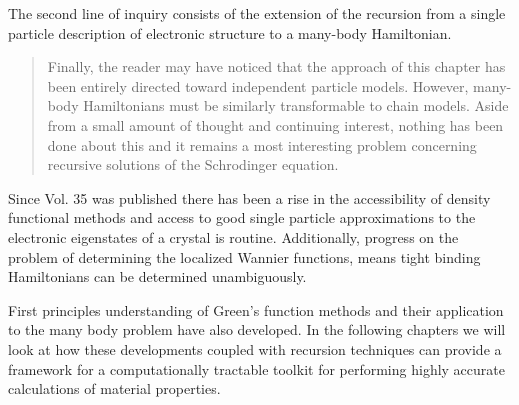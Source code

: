 The second line of inquiry consists of the extension of the recursion from a single 
particle description of electronic structure to a many-body Hamiltonian.
%
\begin{quote}
Finally, the reader may have noticed that the approach of this chapter has been entirely directed
toward independent particle models. However, many-body Hamiltonians must be similarly 
transformable to chain models. Aside from a small amount of thought and continuing interest, 
nothing has been done about this and it remains a most interesting problem concerning recursive 
solutions of the Schrodinger equation.
\end{quote}

	Since Vol. 35 was published there has been a rise in the accessibility of density functional methods 
and access to good single particle approximations to the electronic eigenstates of a crystal
is routine. Additionally, progress on the problem of determining the localized Wannier functions, 
means tight binding Hamiltonians can be determined unambiguously.

First principles understanding of Green's function methods and their application to the many body
problem have also developed. In the following chapters we will look at how these developments
coupled with recursion techniques can provide a framework for a computationally tractable 
toolkit for performing highly accurate calculations of material properties.

